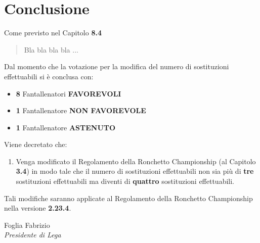 \documentclass[12pt]{article}
\begin{document}
\newpage
\section*{Conclusione}
Come previsto nel Capitolo \textbf{8.4}

\begin{quote}
    Bla bla bla bla ...
\end{quote}

Dal momento che la votazione per la modifica del numero di sostituzioni effettuabili si è conclusa con:
\begin{itemize}
    \item \textbf{8} Fantallenatori \textbf{FAVOREVOLI}
    \item \textbf{1} Fantallenatore \textbf{NON FAVOREVOLE}
    \item \textbf{1} Fantallenatore \textbf{ASTENUTO}
\end{itemize}

Viene decretato che:
\begin{enumerate}
    \item Venga modificato il Regolamento della Ronchetto Championship (al Capitolo \textbf{3.4}) in modo tale che il numero di sostituzioni effettuabili non sia più di \textbf{tre} sostituzioni effettuabili ma diventi di \textbf{quattro} sostituzioni effettuabili.
\end{enumerate}

Tali modifiche saranno applicate al Regolamento della Ronchetto Championship nella versione \textbf{2.23.4}. 

\begin{flushright}
    \vspace*{\fill}
    Foglia Fabrizio \\ \textit{Presidente di Lega}
    \vspace{0.5cm} %
\end{flushright}
    
\end{document}
